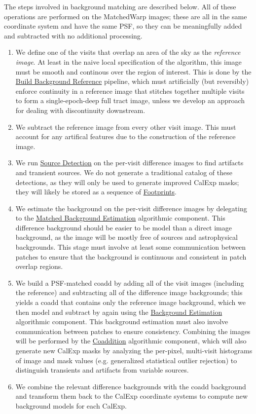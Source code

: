 The steps involved in background matching are described below.  All of these operations are performed on the MatchedWarp images; these are all in the same coordinate system and have the same PSF, so they can be meaningfully added and subtracted with no additional processing.
\begin{enumerate}
\item We define one of the visits that overlap an area of the sky as the \emph{reference image}.  At least in the naive local specification of the algorithm, this image must be smooth and continous over the region of interest.  This is done by the \hyperref[sec:acBuildBackgroundReference]{Build Background Reference} pipeline, which must artificially (but reversibly) enforce continuity in a reference image that stitches together multiple visits to form a single-epoch-deep full tract image, unless we develop an approach for dealing with discontinuity downstream.
\item We subtract the reference image from every other visit image.  This must account for any artifical features due to the construction of the reference image.
\item We run \hyperref[sec:acSourceDetection]{Source Detection} on the per-visit difference images to find artifacts and transient sources.  We do not generate a traditional catalog of these detections, as they will only be used to generate improved CalExp masks; they will likely be stored as a sequence of \hyperref[sec:spFootprints]{Footprints}.
\item We estimate the background on the per-visit difference images by delegating to the \hyperref[sec:acMatchedBackgroundEstimation]{Matched Background Estimation} algorithmic component.  This difference background should be easier to be model than a direct image background, as the image will be mostly free of sources and astrophysical backgrounds.  This stage must involve at least some communication between patches to ensure that the background is continuous and consistent in patch overlap regions.
\item We build a PSF-matched coadd by adding all of the visit images (including the reference) and subtracting all of the difference image backgrounds; this yields a coadd that contains only the reference image background, which we then model and subtract by again using the \hyperref[sec:acBackgroundEstimation]{Background Estimation} algorithmic component.  This background estimation must also involve communication between patches to ensure consistency.  Combining the images will be performed by the \hyperref[sec:acCoaddition]{Coaddition} algorithmic component, which will also generate new CalExp masks by analyzing the per-pixel, multi-visit histograms of image and mask values (e.g. generalized statistical outlier rejection) to distinguish transients and artifacts from variable sources.
\item We combine the relevant difference backgrounds with the coadd background and transform them back to the CalExp coordinate systems to compute new background models for each CalExp.
\end{enumerate}

